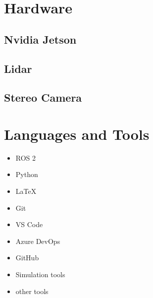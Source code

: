 \section{Hardware}

\subsection{Nvidia Jetson}
\lipsum[1]

\subsection{Lidar}
\lipsum[1]

\subsection{Stereo Camera}
\lipsum[1]

\section{Languages and Tools}

\begin{itemize}
    \item ROS 2
    \item Python
    \item LaTeX
    \item Git
    \item VS Code
    \item Azure DevOps
    \item GitHub
    \item Simulation tools
    \item other tools
\end{itemize}

\lipsum[1]
